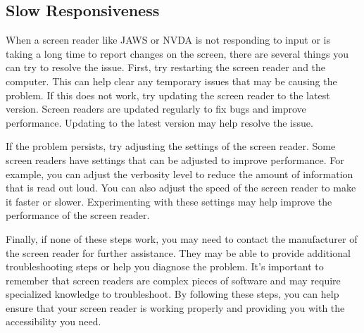 \documentclass[12pt,letterpaper,twoside]{extreport}
\begin{document}
\begin{appendices}
\hypertarget{response}{}\subsection{Slow Responsiveness}\label{response}
When a screen reader like JAWS or NVDA is not responding to input or is taking a long time to report changes on the screen, there are several things you can try to resolve the issue. First, try restarting the screen reader and the computer. This can help clear any temporary issues that may be causing the problem. If this does not work, try updating the screen reader to the latest version. Screen readers are updated regularly to fix bugs and improve performance. Updating to the latest version may help resolve the issue.

If the problem persists, try adjusting the settings of the screen reader. Some screen readers have settings that can be adjusted to improve performance. For example, you can adjust the verbosity level to reduce the amount of information that is read out loud. You can also adjust the speed of the screen reader to make it faster or slower. Experimenting with these settings may help improve the performance of the screen reader.

Finally, if none of these steps work, you may need to contact the manufacturer of the screen reader for further assistance. They may be able to provide additional troubleshooting steps or help you diagnose the problem. It’s important to remember that screen readers are complex pieces of software and may require specialized knowledge to troubleshoot. By following these steps, you can help ensure that your screen reader is working properly and providing you with the accessibility you need.


\end{appendices}
\end{document}
